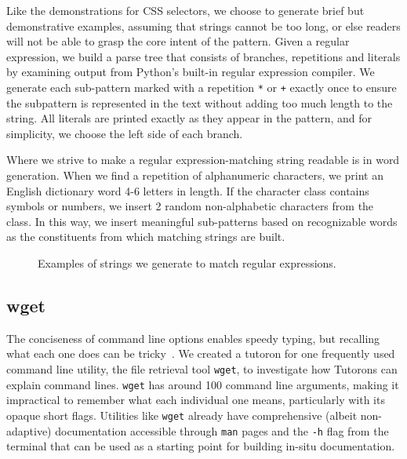 Like the demonstrations for CSS selectors, we choose to generate brief but demonstrative examples, assuming that strings cannot be too long, or else readers will not be able to grasp the core intent of the pattern.
Given a regular expression, we build a parse tree that consists of branches, repetitions and literals by examining output from Python's built-in regular expression compiler.
We generate each sub-pattern marked with a repetition \texttt{*} or \texttt{+} exactly once to ensure the subpattern is represented in the text without adding too much length to the string.
All literals are printed exactly as they appear in the pattern, and for simplicity, we choose the left side of each branch. 

Where we strive to make a regular expression-matching string readable is in word generation.
When we find a repetition of alphanumeric characters, we print an English dictionary word 4-6 letters in length.
If the character class contains symbols or numbers, we insert 2 random non-alphabetic characters from the class.
In this way, we insert meaningful sub-patterns based on recognizable words as the constituents from which matching strings are built.

\begin{figure}
\centering
\setlength{\fboxsep}{10pt}
\noindent{}
\caption{Examples of strings we generate to match regular expressions.}
\label{fig:regex_strings}
\end{figure}

\subsection{wget}

The conciseness of command line options enables speedy typing, but recalling what each one does can be tricky~\cite{miller_inky_2008}.
We created a tutoron for one frequently used command line utility, the file retrieval tool \texttt{wget}, to investigate how Tutorons can explain command lines. \texttt{wget} has around 100 command line arguments, making it impractical to remember what each individual one means, particularly with its opaque short flags.
Utilities like \texttt{wget} already have comprehensive (albeit non-adaptive) documentation accessible through \texttt{man} pages and the \texttt{-h} flag from the terminal that can be used as a starting point for building in-situ documentation.

